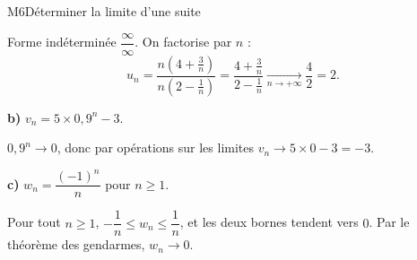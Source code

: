 \begin{fichemethode}{M6}{Déterminer la limite d'une suite}
{  %
  Forme indéterminée $\dfrac{\infty}{\infty}$. On factorise par $n$ :
  \[
    u_n = \frac{n\left(4+\frac{3}{n}\right)}{n\left(2-\frac{1}{n}\right)}
        = \frac{4+\frac{3}{n}}{2-\frac{1}{n}}
        \xrightarrow[n\to+\infty]{} \frac{4}{2} = 2 .
  \]

  \medskip
  \textbf{b)} $v_n = 5\times0{,}9^n - 3$.

  $0{,}9^n \to 0$, donc par opérations sur les limites $v_n \to 5\times0-3=-3$.

  \medskip
  \textbf{c)} $w_n = \dfrac{(-1)^n}{n}$ pour $n \geq 1$.

  Pour tout $n \geq 1$, $-\dfrac{1}{n} \leq w_n \leq \dfrac{1}{n}$, et les deux
  bornes tendent vers $0$. Par le théorème des gendarmes, $w_n \to 0$.
}

%
%
%
%
%
%
%


\end{fichemethode}
